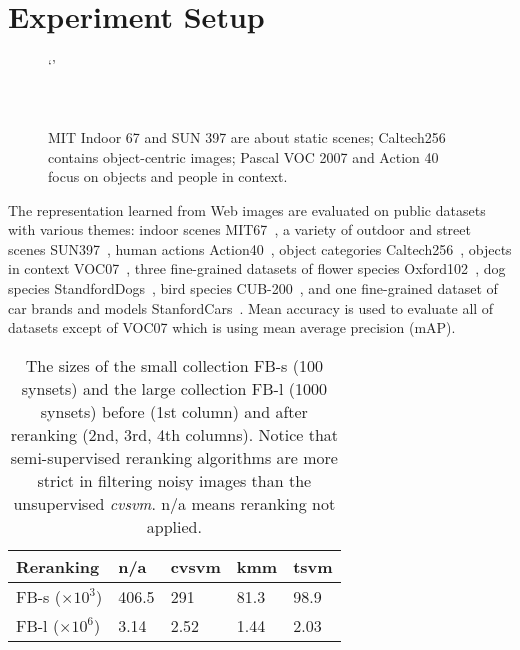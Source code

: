 \documentclass[preprint,12pt]{elsarticle}
\begin{document}
\section{Experiment Setup}\label{sec:expt}
\begin{figure}[!t]
\centering`'
 \\
\,
 \\
\,
\label{fig:datasets}
\caption{MIT Indoor 67 and SUN 397 are about static scenes; Caltech256 contains object-centric images; Pascal VOC 2007 and Action 40 focus on objects and people in context.}
\end{figure}
The representation learned from Web images are evaluated on public datasets with various themes: indoor scenes MIT67~\cite{DBLP:conf/cvpr/QuattoniT09}, a variety of outdoor and street scenes SUN397~\cite{DBLP:conf/cvpr/XiaoHEOT10}, human actions Action40~\cite{DBLP:conf/iccv/YaoJKLGF11}, object categories Caltech256~\cite{griffin2007caltech}, objects in context VOC07~\cite{Everingham10}, three fine-grained datasets of flower species  Oxford102~\cite{Nilsback08}, dog species StandfordDogs~\cite{}, bird species CUB-200~\cite{WelinderEtal2010}, and one fine-grained dataset of car brands and models StanfordCars~\cite{krause20133d}. Mean accuracy is used to evaluate all of datasets except of VOC07 which is using mean average precision (mAP). %
\begin{table}
\small
\begin{centering}
\begin{tabular}{l|llll}
 Reranking & n/a & cvsvm & kmm & tsvm \tabularnewline
 \hline 
 FB-s ($\times 10^3$) & 406.5 & 291 & 81.3 & 98.9 \tabularnewline
 FB-l ($\times 10^6$) & 3.14 & 2.52 & 1.44 & 2.03 \tabularnewline
\end{tabular}
\par\end{centering}
\caption{The sizes of the small collection FB-s (100 synsets) and the large collection FB-l (1000 synsets) before (1st column) and after reranking (2nd, 3rd, 4th columns). Notice that semi-supervised reranking algorithms are more strict in filtering noisy images than the unsupervised \emph{cvsvm}. n/a means reranking not applied. }
\label{table:numimgs}
\end{table}
\end{document}
